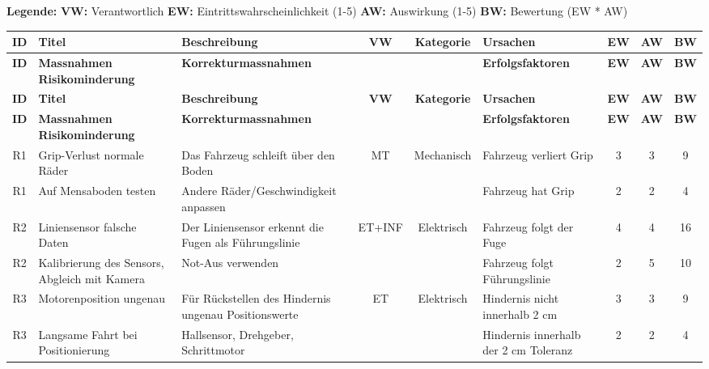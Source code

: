 \documentclass[../main.tex]{subfiles}
\begin{document}
\begin{landscape}
\scriptsize

\textbf{Legende:}
\hspace{1cm}
\textbf{VW:} Verantwortlich
\hspace{1cm}
\textbf{EW:} Eintrittswahrscheinlichkeit (1-5)
\hspace{1cm}
\textbf{AW:} Auswirkung (1-5)
\hspace{1cm}
\textbf{BW:} Bewertung (EW * AW)

\renewcommand{\arraystretch}{1.5} %
\begin{longtable}{|c|p{4cm}|p{4cm}|c|c|p{4cm}|c|c|c|}
\hline
\rowcolor{white} 
\textbf{ID} & \textbf{Titel} & \textbf{Beschreibung} & \textbf{VW} & \textbf{Kategorie} & \textbf{Ursachen} & \textbf{EW} & \textbf{AW} & \textbf{BW} \\ \hline
\rowcolor{white}
\textbf{ID} & \textbf{Massnahmen Risikominderung} & \textbf{Korrekturmassnahmen} & & & \textbf{Erfolgsfaktoren} & \textbf{EW} & \textbf{AW} & \textbf{BW} \\ \hline
\endfirsthead
\hline
\rowcolor{white} 
\textbf{ID} & \textbf{Titel} & \textbf{Beschreibung} & \textbf{VW} & \textbf{Kategorie} & \textbf{Ursachen} & \textbf{EW} & \textbf{AW} & \textbf{BW} \\ \hline
\rowcolor{white}
\textbf{ID} & \textbf{Massnahmen Risikominderung} & \textbf{Korrekturmassnahmen} & & & \textbf{Erfolgsfaktoren} & \textbf{EW} & \textbf{AW} & \textbf{BW} \\ \hline
\endhead

\rowcolor[HTML]{F5F5F5} R1 & Grip-Verlust normale Räder & Das Fahrzeug schleift über den Boden & MT & Mechanisch & Fahrzeug verliert Grip & 3 & 3 & 9 \\ \hline
\rowcolor[HTML]{F5F5F5} R1 & Auf Mensaboden testen & Andere Räder/Geschwindigkeit anpassen & & & Fahrzeug hat Grip & 2 & 2 & 4 \\ \hline


\rowcolor{white} R2 & Liniensensor falsche Daten & Der Liniensensor erkennt die Fugen als Führungslinie & ET+INF & Elektrisch & Fahrzeug folgt der Fuge & 4 & 4 & 16 \\ \hline
\rowcolor{white} R2 & Kalibrierung des Sensors, Abgleich mit Kamera & Not-Aus verwenden & & & Fahrzeug folgt Führungslinie & 2 & 5 & 10 \\ \hline

\rowcolor[HTML]{F5F5F5} R3 & Motorenposition ungenau & Für Rückstellen des Hindernis ungenau Positionswerte & ET & Elektrisch & Hindernis nicht innerhalb 2 cm & 3 & 3 & 9 \\ \hline
\rowcolor[HTML]{F5F5F5} R3 & Langsame Fahrt bei Positionierung & Hallsensor, Drehgeber, Schrittmotor & & & Hindernis innerhalb der 2 cm Toleranz & 2 & 2 & 4 \\ \hline


\end{longtable}
\end{landscape}
\end{document}
